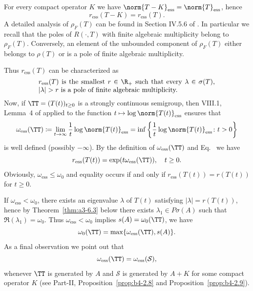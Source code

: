 \begin{example}
For every compact operator $K$ we have $\norm{T - K}_{\text{ess}} = \norm{T}_{\text{ess}}$, hence
\begin{equation}\label{eq:a3-3.7}
r_{\text{ess}}(T - K) = r_{\text{ess}}(T) .
\end{equation}
A detailed analysis of\/ $\rho_{F}(T)$ can be found in Section IV.5.6 of \textcite{kato:1976}.
In particular we recall that the poles 
of\/ $R(\cdot,T)$ with finite algebraic multiplicity belong to $\rho_{F}(T)$.
Conversely, an element of the unbounded component of\/ $\rho_{F}(T)$ either belongs to $\rho(T)$ or is a pole of finite algebraic multiplicity.

Thus $r_{\text{ess}}(T)$ can be characterized as
\begin{equation}\label{eq:a3-3.8}
\begin{minipage}{.75\textwidth}
$r_{\text{ess}}(T) $ is the smallest   $r \in \R_{+}$    such that every   
$\lambda \in \sigma(T)$, $ |\lambda| > r $  is a pole of finite algebraic multiplicity. 
\end{minipage}
\end{equation}
Now, if\/ $\TT = (T(t))_{t \geq 0}$ is a strongly continuous semigroup, then VIII.1, Lemma~4 of \textcite{dunfordschwartz:1958} applied to the function $t \mapsto \log \norm{T(t)}_{\text{ess}}$ ensures that
\begin{equation}\label{eq:a3-3.9}
\omega_{\text{ess}}(\TT) \coloneqq \lim_{t \to \infty} \frac{1}{t} \log\norm{T(t)}_{\text{ess}} = \inf \left\{\frac{1}{t} \log\norm{T(t)}_{\text{ess}} \colon t > 0\right\}
\end{equation}
is well defined (possibly $-\infty$).
By the definition of\/ $\omega_{\text{ess}}(\TT)$ and Eq.~ we have
\begin{equation}\label{eq:a3-3.10}
r_{\text{ess}}(T(t)) = \exp(t\omega_{\text{ess}}(\TT)), \quad t \geq 0 .
\end{equation}
Obviously, $\omega_{\text{ess}} \leq \omega_{0}$ and equality occurs if and only if\/ $r_{\text{ess}}(T(t)) = r(T(t))$ for $t \geq 0$.

If\/ $\omega_{\text{ess}} < \omega_{0}$, there exists an eigenvalue $\lambda$ of\/ $T(t)$ satisfying $|\lambda| = r(T(t))$, hence by Theorem~\ref{thm:a3-6.3} below there exists $\lambda_{1} \in P\sigma(A)$ such that $\Re(\lambda_{1}) = \omega_{0}$.
Thus $\omega_{\text{ess}} < \omega_{0}$ implies $s(A) = \omega_{0}(\TT)$, \ie we have
\begin{equation}\label{eq:a3-3.11}
\omega_{0}(\TT) = \max\{\omega_{\text{ess}}(\TT),s(A)\} .
\end{equation}
As a final observation we point out that
\begin{equation}\label{eq:a3-3.12}
\omega_{\text{ess}}(\TT) = \omega_{\text{ess}}({\mathcal{S}}) ,
\end{equation}
whenever $\TT$ is generated by $A$ and $\mathcal{S}$ is generated by $A + K$ for some compact operator $K$ 
(see Part-II, Proposition~\ref{prop:b4-2.8} and Proposition~\ref{prop:b4-2.9}).
\end{example}
